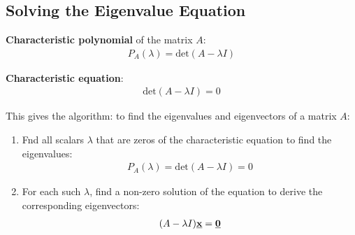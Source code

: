 \documentclass[10pt,a4paper]{article}
\begin{document}
\subsection{Solving the Eigenvalue Equation}

\begin{tcolorbox}[breakable,colback=white]
    \textbf{Characteristic polynomial} of the matrix $A$: 
    \begin{align*}
        P_A(\lambda) = \text{det}(A-\lambda I)
    \end{align*}

    \textbf{Characteristic equation}: 
    \begin{align*}
    \text{det}(A-\lambda I) = 0
    \end{align*}
\end{tcolorbox}

\pagebreak

This gives the algorithm: to ﬁnd the eigenvalues and eigenvectors of a matrix $A$:
\begin{enumerate}
    \item Fnd all scalars $\lambda$ that are zeros of the characteristic equation to ﬁnd the eigenvalues:
    \begin{align*}
        P_A(\lambda) = \text{det}(A-\lambda I) = 0
    \end{align*}

    \item For each such $\lambda$, ﬁnd a non-zero solution of the equation to derive the corresponding eigenvectors:
    \begin{align*}
        (A - \lambda I)\textbf{\underline{x}} = \textbf{\underline{0}}
    \end{align*}
\end{enumerate}
\end{document}
